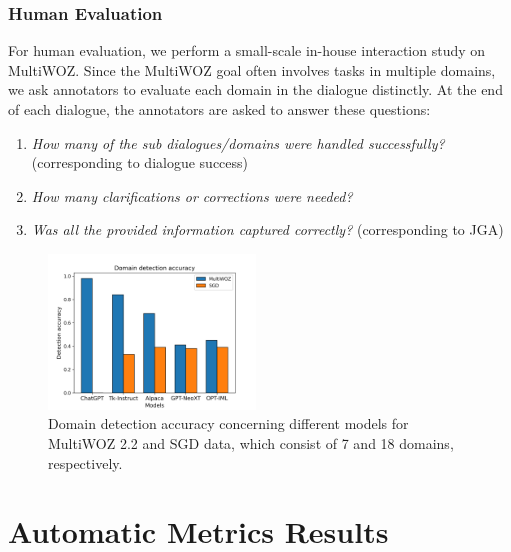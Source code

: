 \subsubsection*{Human Evaluation}
For human evaluation, we perform a small-scale in-house interaction study on MultiWOZ.
Since the MultiWOZ goal often involves tasks in multiple domains, we ask annotators to evaluate each domain in the dialogue distinctly.
At the end of each dialogue, the annotators are asked to answer these questions:
\begin{enumerate}
    \item \emph{How many of the sub dialogues/domains were handled successfully?} (corresponding to dialogue success)
    \item \emph{How many clarifications or corrections were needed?}
    \item \emph{Was all the provided information captured correctly?} (corresponding to JGA)
\end{enumerate}

\begin{figure}[h]
    \centering
    \includegraphics[width=0.49\textwidth]{images/domain-detections.png}
    \caption{Domain detection accuracy concerning different models for MultiWOZ 2.2 and SGD data, which consist of 7 and 18 domains, respectively.}
    \label{07:fig:domains}
\end{figure}


\section{Automatic Metrics Results}
\label{07:sec:results}

